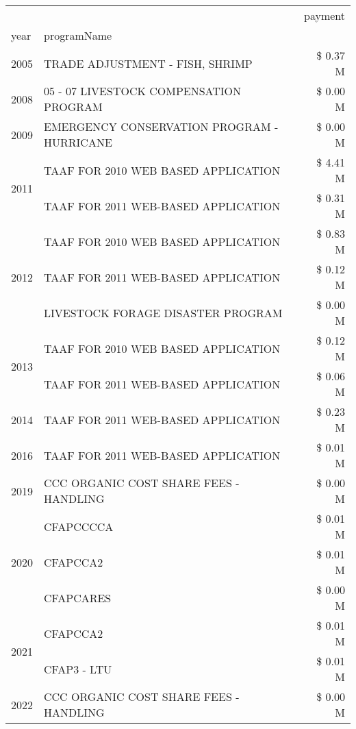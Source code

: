 \begin{tabular}{llr}
\toprule
 &  & payment \\
year & programName &  \\
\midrule
2005 & TRADE ADJUSTMENT - FISH, SHRIMP & \$ 0.37 M \\
\cline{1-3}
2008 & 05 - 07 LIVESTOCK COMPENSATION PROGRAM & \$ 0.00 M \\
\cline{1-3}
2009 & EMERGENCY CONSERVATION PROGRAM - HURRICANE & \$ 0.00 M \\
\cline{1-3}
\multirow[t]{2}{*}{2011} & TAAF FOR 2010 WEB BASED APPLICATION & \$ 4.41 M \\
 & TAAF FOR 2011 WEB-BASED APPLICATION & \$ 0.31 M \\
\cline{1-3}
\multirow[t]{3}{*}{2012} & TAAF FOR 2010 WEB BASED APPLICATION & \$ 0.83 M \\
 & TAAF FOR 2011 WEB-BASED APPLICATION & \$ 0.12 M \\
 & LIVESTOCK FORAGE DISASTER PROGRAM & \$ 0.00 M \\
\cline{1-3}
\multirow[t]{2}{*}{2013} & TAAF FOR 2010 WEB BASED APPLICATION & \$ 0.12 M \\
 & TAAF FOR 2011 WEB-BASED APPLICATION & \$ 0.06 M \\
\cline{1-3}
2014 & TAAF FOR 2011 WEB-BASED APPLICATION & \$ 0.23 M \\
\cline{1-3}
2016 & TAAF FOR 2011 WEB-BASED APPLICATION & \$ 0.01 M \\
\cline{1-3}
2019 & CCC ORGANIC COST SHARE FEES - HANDLING & \$ 0.00 M \\
\cline{1-3}
\multirow[t]{3}{*}{2020} & CFAPCCCCA & \$ 0.01 M \\
 & CFAPCCA2 & \$ 0.01 M \\
 & CFAPCARES & \$ 0.00 M \\
\cline{1-3}
\multirow[t]{2}{*}{2021} & CFAPCCA2 & \$ 0.01 M \\
 & CFAP3 - LTU & \$ 0.01 M \\
\cline{1-3}
2022 & CCC ORGANIC COST SHARE FEES - HANDLING & \$ 0.00 M \\
\cline{1-3}
\bottomrule
\end{tabular}

